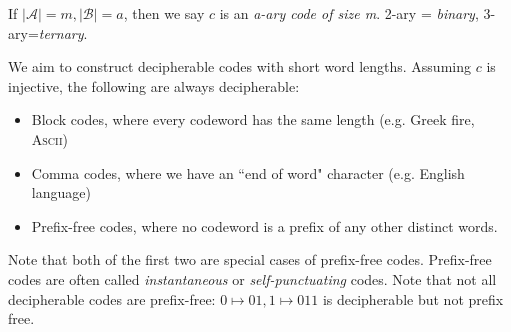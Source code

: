 \documentclass[10pt,a4paper]{article}
\begin{document}
If $|\mathcal{A}|=m, |\mathcal{B}|=a$, then we say $c$ is an \emph{a-ary code of size m}. 2-ary = \emph{binary}, 3-ary=\emph{ternary}.

We aim to construct decipherable codes with short word lengths. Assuming $c$ is injective, the following are always decipherable:
\begin{itemize}
\item Block codes, where every codeword has the same length (e.g. Greek fire, \textsc{Ascii})
\item Comma codes, where we have an ``end of word" character (e.g. English language)
\item Prefix-free codes, where no codeword is a prefix of any other distinct words.
\end{itemize}
Note that both of the first two are special cases of prefix-free codes. Prefix-free codes are often called \emph{instantaneous} or \emph{self-punctuating} codes. Note that not all decipherable codes are prefix-free: $0\mapsto 01, 1 \mapsto 011$ is decipherable but not prefix free.
\end{document}
